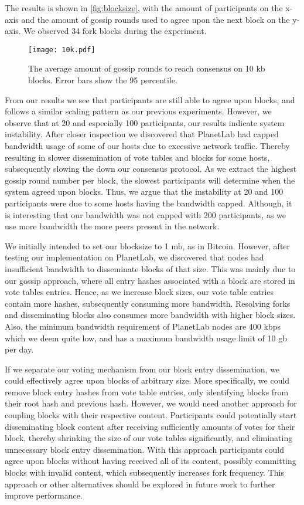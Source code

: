 \documentclass[USenglish]{uit-thesis}
\begin{document}
The results is shown in \autoref{fig:blocksize}, with the amount of participants on the x-axis and the amount of gossip rounds used to agree upon the next block on the y-axis.
We observed 34 fork blocks during the experiment.
\begin{figure}[h]
	\centering
	\texttt{[image: 10k.pdf]}
	\caption{The average amount of gossip rounds to reach consensus on 10 \gls{kb} blocks.
		Error bars show the 95 percentile.  }
	\label{fig:blocksize}
\end{figure}

From our results we see that participants are still able to agree upon blocks, and follows a similar scaling pattern as our previous experiments.
However, we observe that at 20 and especially 100 participants, our results indicate system instability.
After closer inspection we discovered that PlanetLab had capped bandwidth usage of some of our hosts due to excessive network traffic.
Thereby resulting in slower dissemination of vote tables and blocks for some hosts, subsequently slowing the down our consensus protocol.
As we extract the highest gossip round number per block, the slowest participants will determine when the system agreed upon blocks.
Thus, we argue that the instability at 20 and 100 participants were due to some hosts having the bandwidth capped.
Although, it is interesting that our bandwidth was not capped with 200 participants, as we use more bandwidth the more peers present in the network. 


We initially intended to set our blocksize to 1 \gls{mb}, as in Bitcoin.
However, after testing our implementation on PlanetLab, we discovered that nodes had insufficient bandwidth to disseminate blocks of that size.
This was mainly due to our gossip approach, where all entry hashes associated with a block are stored in vote tables entries. 
Hence, as we increase block sizes, our vote table entries contain more hashes, subsequently consuming more bandwidth.
Resolving forks and disseminating blocks also consumes more bandwidth with higher block sizes.
Also, the minimum bandwidth requirement of PlanetLab nodes are 400 \gls{kbps} which we deem quite low, and has a maximum bandwidth usage limit of 10 \gls{gb} per day.

If we separate our voting mechanism from our block entry dissemination, we could effectively agree upon blocks of arbitrary size.
More specifically, we could remove block entry hashes from vote table entries, only identifying blocks from their root hash and previous hash.
However, we would need another approach for coupling blocks with their respective content.
Participants could potentially start disseminating block content after receiving sufficiently amounts of votes for their block, thereby shrinking the size of our vote tables significantly, and eliminating unnecessary block entry dissemination.
With this approach participants could agree upon blocks without having received all of its content, possibly committing blocks with invalid content, which subsequently increases fork frequency.
This approach or other alternatives should be explored in future work to further improve performance.   
\end{document}
